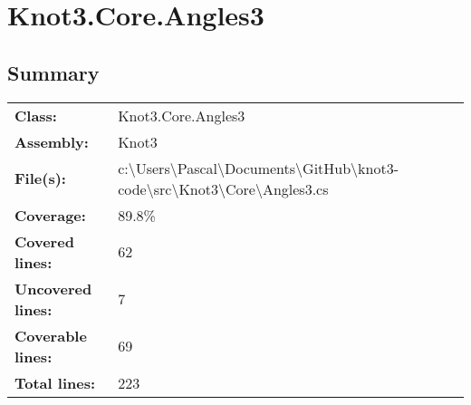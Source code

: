 \documentclass[a4paper,10pt]{article}
\begin{document}
\section{Knot3.Core.Angles3}
\subsection{Summary}
\begin{longtable}[l]{ll}
\textbf{Class:} & Knot3.Core.Angles3\\
\textbf{Assembly:} & Knot3\\
\textbf{File(s):} & \begin{minipage}[t]{12cm}{c:\textbackslash Users\textbackslash Pascal\textbackslash Documents\textbackslash GitHub\textbackslash knot3-code\textbackslash src\textbackslash Knot3\textbackslash Core\textbackslash Angles3.cs}\end{minipage} \\
\textbf{Coverage:} & 89.8\%\\
\textbf{Covered lines:} & 62\\
\textbf{Uncovered lines:} & 7\\
\textbf{Coverable lines:} & 69\\
\textbf{Total lines:} & 223\\
\end{longtable}
\end{document}

